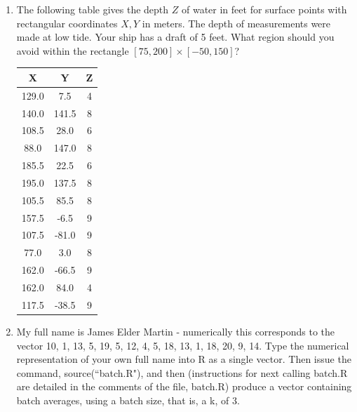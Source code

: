 \documentclass{hw}
\begin{document}
\begin{enumerate}
\begin{quote}
\begin{minipage}{0.5\textwidth}
\end{minipage}
\end{quote}

\newpage
\item The following table gives the depth $Z$ of water in feet for surface points with rectangular
coordinates $X, Y$ in meters. The depth of measurements were made at low tide. Your ship has a draft of 5
feet. What region should you avoid within the rectangle $[75, 200] \times [−50, 150]$?
\begin{center}
\begin{tabular}{c | c | c}
X & Y & Z\\
\hline
129.0 & 7.5 & 4\\
140.0 & 141.5 & 8\\
108.5 & 28.0 & 6\\
88.0 & 147.0 & 8\\
185.5 & 22.5 & 6\\
195.0 & 137.5 & 8\\
105.5 & 85.5 & 8\\
157.5 & -6.5 & 9\\
107.5 & -81.0 & 9\\
77.0 & 3.0 & 8\\
162.0 & -66.5 & 9\\
162.0 & 84.0 & 4\\
117.5 & -38.5 & 9
\end{tabular}
\end{center}

\newpage
\item My full name is James Elder Martin - numerically this corresponds to the vector 10, 1, 13, 5, 19, 5,
12, 4, 5, 18, 13, 1, 18, 20, 9, 14. Type the numerical representation of your own full name into R as a
single vector. Then issue the command, source(``batch.R"), and then (instructions for next calling batch.R
are detailed in the comments of the file, batch.R) produce a vector containing batch averages, using a
batch size, that is, a k, of 3.
\begin{quote}
\inputminted{r}{num_three.R}
\end{quote}
\end{enumerate}
\end{document}
